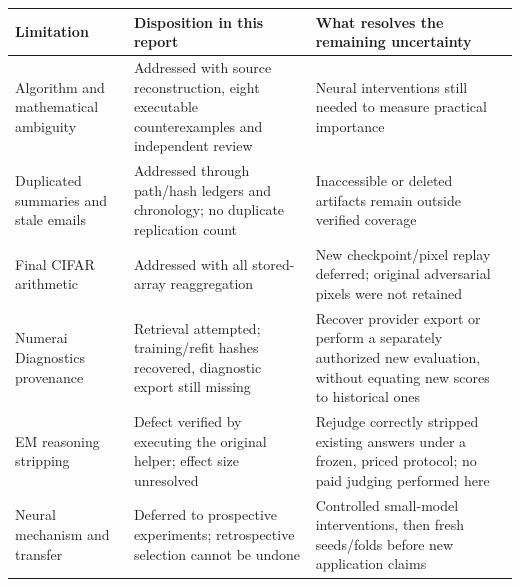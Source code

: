 \documentclass[
  british,
  10pt,
  a4paper,
]{article}
\newcounter{none} %
\begin{document}
{\def\LTcaptype{none} %
\begin{longtable}[]{@{}
  >{\raggedright\arraybackslash}p{}
  >{\raggedright\arraybackslash}p{}
  >{\raggedright\arraybackslash}p{}@{}}
\toprule\noalign{}
\begin{minipage}[b]{\linewidth}\raggedright
Limitation
\end{minipage} & \begin{minipage}[b]{\linewidth}\raggedright
Disposition in this report
\end{minipage} & \begin{minipage}[b]{\linewidth}\raggedright
What resolves the remaining uncertainty
\end{minipage} \\
\midrule\noalign{}
\endhead
\bottomrule\noalign{}
\endlastfoot
Algorithm and mathematical ambiguity & Addressed with source
reconstructi\allowbreak{}on,\allowbreak{} eight executable
counterexamples and independent review & Neural interventions still
needed to measure practical importance \\
Duplicated summaries and stale emails & Addressed through path/hash
ledgers and chronology; no duplicate replication count & Inaccessible or
deleted artifacts remain outside verified coverage \\
Final CIFAR arithmetic & Addressed with all stored-\allowbreak{}array
reaggregation & New checkpoint/\allowbreak{}pixel replay deferred;
original adversarial pixels were not retained \\
Numerai Diagnostics provenance & Retrieval attempted;
training/\allowbreak{}refit hashes recovered, diagnostic export still
missing & Recover provider export or perform a separately authorized new
evaluation,\allowbreak{} without equating new scores to historical
ones \\
EM reasoning stripping & Defect verified by executing the original
helper; effect size unresolved & Rejudge correctly stripped existing
answers under a frozen, priced protocol; no paid judging performed
here \\
Neural mechanism and transfer & Deferred to prospective experiments;
retrospective selection cannot be undone & Controlled
small-\allowbreak{}model intervention\allowbreak{}s,\allowbreak{} then
fresh seeds/\allowbreak{}folds before new application claims \\
\end{longtable}
}
\end{document}
